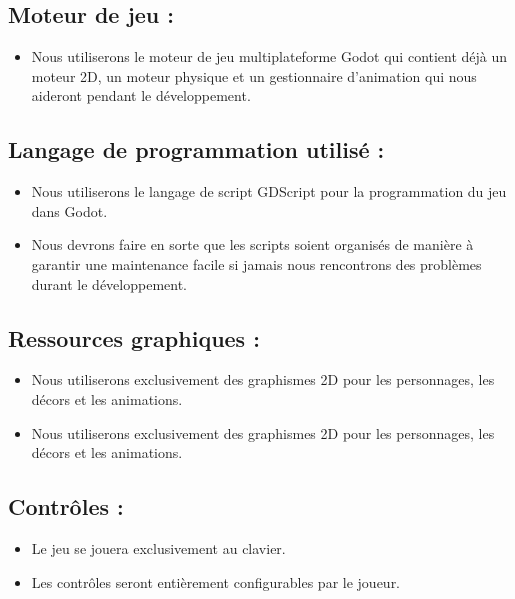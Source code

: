 \documentclass{report}
\begin{document}
\vspace{0.5cm}

\subsection{Moteur de jeu :}

\begin{itemize}[label={\textbf{--}}]
    \item Nous utiliserons le moteur de jeu multiplateforme Godot qui contient déjà un moteur 2D, un moteur physique et un gestionnaire d’animation qui nous aideront pendant le développement. 
\end{itemize}

\subsection{Langage de programmation utilisé :}

\begin{itemize}[label={\textbf{--}}]
    \item Nous utiliserons le langage de script GDScript pour la programmation du jeu dans Godot. 
    \item Nous devrons faire en sorte que les scripts soient organisés de manière à garantir une maintenance facile si jamais nous rencontrons des problèmes durant le développement. 
\end{itemize}

\subsection{Ressources graphiques :}

\begin{itemize}[label={\textbf{--}}]
    \item Nous utiliserons exclusivement des graphismes 2D pour les personnages, les décors et les animations.
    \item Nous utiliserons exclusivement des graphismes 2D pour les personnages, les décors et les animations.
\end{itemize}

\subsection{Contrôles :}

\begin{itemize}[label={\textbf{--}}]
    \item Le jeu se jouera exclusivement au clavier.
    \item Les contrôles seront entièrement configurables par le joueur.
\end{itemize}
\end{document}
